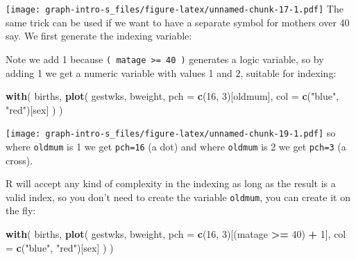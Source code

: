 \documentclass[
]{book}
\newenvironment{Shaded}{\begin{snugshade}}{\end{snugshade}}
\newcommand{\AttributeTok}[1]{\textcolor[rgb]{0.13,0.29,0.53}{#1}}
\newcommand{\DecValTok}[1]{\textcolor[rgb]{0.00,0.00,0.81}{#1}}
\newcommand{\FunctionTok}[1]{\textcolor[rgb]{0.13,0.29,0.53}{\textbf{#1}}}
\newcommand{\NormalTok}[1]{#1}
\newcommand{\OtherTok}[1]{\textcolor[rgb]{0.56,0.35,0.01}{#1}}
\newcommand{\SpecialCharTok}[1]{\textcolor[rgb]{0.81,0.36,0.00}{\textbf{#1}}}
\newcommand{\StringTok}[1]{\textcolor[rgb]{0.31,0.60,0.02}{#1}}
\begin{document}
\texttt{[image: graph-intro-s\_files/figure-latex/unnamed-chunk-17-1.pdf]}
The same trick can be used if we want to have a separate symbol for
mothers over 40 say. We first generate the indexing variable:

\begin{Shaded}
\end{Shaded}

Note we add 1 because \texttt{(\ matage\ \textgreater{}=\ 40\ )} generates a logic
variable, so by adding 1 we get a numeric variable with values 1 and
2, suitable for indexing:

\begin{Shaded}
\begin{Highlighting}[]
\FunctionTok{with}\NormalTok{(}
\NormalTok{  births, }
  \FunctionTok{plot}\NormalTok{(}
\NormalTok{    gestwks, }
\NormalTok{    bweight, }
    \AttributeTok{pch =} \FunctionTok{c}\NormalTok{(}\DecValTok{16}\NormalTok{, }\DecValTok{3}\NormalTok{)[oldmum], }
    \AttributeTok{col =} \FunctionTok{c}\NormalTok{(}\StringTok{"blue"}\NormalTok{, }\StringTok{"red"}\NormalTok{)[sex]}
\NormalTok{  )}
\NormalTok{)}
\end{Highlighting}
\end{Shaded}

\texttt{[image: graph-intro-s\_files/figure-latex/unnamed-chunk-19-1.pdf]}
so where \texttt{oldmum} is 1 we get \texttt{pch=16} (a dot) and where
\texttt{oldmum} is 2 we get \texttt{pch=3} (a cross).

R will accept any kind of complexity in the indexing as
long as the result is a valid index, so you don't need to create the
variable \texttt{oldmum}, you can create it on the fly:

\begin{Shaded}
\begin{Highlighting}[]
\FunctionTok{with}\NormalTok{(}
\NormalTok{  births, }
  \FunctionTok{plot}\NormalTok{(}
\NormalTok{    gestwks, }
\NormalTok{    bweight, }
    \AttributeTok{pch =} \FunctionTok{c}\NormalTok{(}\DecValTok{16}\NormalTok{, }\DecValTok{3}\NormalTok{)[(matage }\SpecialCharTok{\textgreater{}=} \DecValTok{40}\NormalTok{) }\SpecialCharTok{+} \DecValTok{1}\NormalTok{], }
    \AttributeTok{col =} \FunctionTok{c}\NormalTok{(}\StringTok{"blue"}\NormalTok{, }\StringTok{"red"}\NormalTok{)[sex]}
\NormalTok{  )}
\NormalTok{)}
\end{Highlighting}
\end{Shaded}
\end{document}
